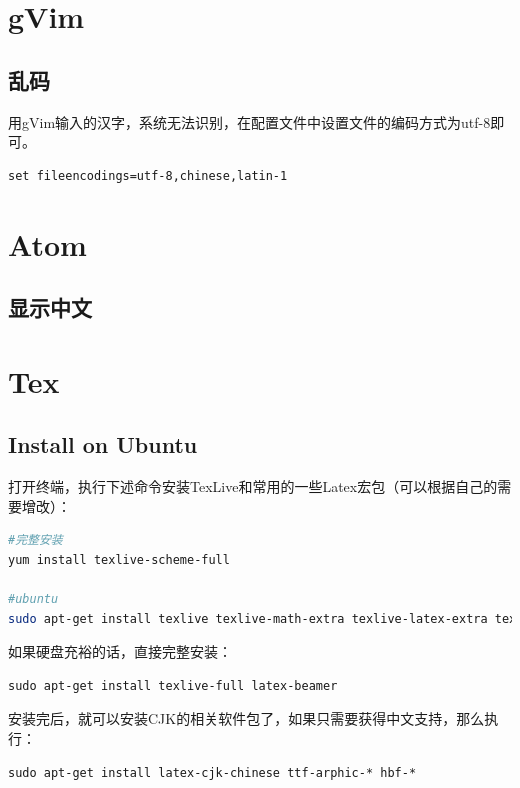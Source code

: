 \documentclass{book}
\begin{document}
\section{gVim}

\subsection{乱码}

用gVim输入的汉字，系统无法识别，在配置文件中设置文件的编码方式为utf-8即可。

\begin{lstlisting}
set fileencodings=utf-8,chinese,latin-1
\end{lstlisting}

\section{Atom}

\subsection{显示中文}

\section{Tex}

\subsection{Install on Ubuntu}

打开终端，执行下述命令安装TexLive和常用的一些Latex宏包（可以根据自己的需要增改）：

\begin{lstlisting}[language=Bash]
#完整安装
yum install texlive-scheme-full

#ubuntu
sudo apt-get install texlive texlive-math-extra texlive-latex-extra texlive-latex-recommended texlive-pictures texlive-science texlive-bibtex-extra latex-beamer
\end{lstlisting}

如果硬盘充裕的话，直接完整安装：

\begin{lstlisting}
sudo apt-get install texlive-full latex-beamer
\end{lstlisting}

安装完后，就可以安装CJK的相关软件包了，如果只需要获得中文支持，那么执行：

\begin{lstlisting}
sudo apt-get install latex-cjk-chinese ttf-arphic-* hbf-*
\end{lstlisting}
\end{document}
